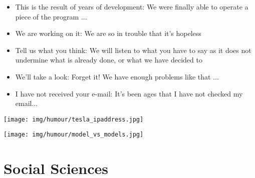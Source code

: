 \begin{itemize}
		\item This is the result of years of development: We were finally able to operate a piece of the program ...
	
		\item We are working on it: We are so in trouble that it's hopeless
	
		\item Tell us what you think: We will listen to what you have to say as it does not undermine what is already done, or what we have decided to
	
		\item We'll take a look: Forget it! We have enough problems like that ...
	
		\item I have not received your e-mail: It's been ages that I have not checked my email...
	\end{itemize}

	\begin{center}\underline{\hspace{5 cm}}\end{center}

	\begin{center}
	\texttt{[image: img/humour/tesla\_ipaddress.jpg]}
	\end{center}
	
	\begin{center}\underline{\hspace{5 cm}}\end{center}	
	
	\begin{center}
	\texttt{[image: img/humour/model\_vs\_models.jpg]}
	\end{center}

	\pagebreak
	\section{Social Sciences}
	
